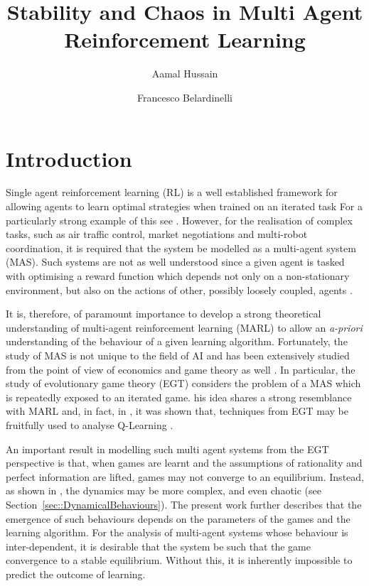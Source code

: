 \documentclass[sigconf]{aamas}
\title[InstabilityinMARL]{Stability and Chaos in Multi Agent Reinforcement Learning}
\author{Aamal Hussain}
\affiliation{
  \department{Department of Computing}
  \institution{Imperial College London}}
\author{Francesco Belardinelli}
\affiliation{
  \department{Department of Computing}
  \institution{Imperial College London}}
\begin{document}

\pagestyle{fancy}
\fancyhead{}


\maketitle 


\section{Introduction}

Single agent reinforcement learning (RL) is a well established framework for allowing agents to learn optimal strategies when trained on an iterated task 
For a particularly strong example of this see \cite{Vinyals2019}. However, for the realisation of complex tasks, such as air traffic control, market negotiations and multi-robot coordination, it is required that the system be modelled as a multi-agent system (MAS). Such systems are not as well understood since a given agent is tasked with optimising a reward function which depends not only on a non-stationary environment, but also on the actions of other, possibly loosely coupled, agents \cite{SchwartzMulti-agentApproach}. 

It is, therefore, of paramount importance to develop a strong theoretical understanding of multi-agent reinforcement learning (MARL) to allow an {\em a-priori} understanding of the behaviour of a given learning algorithm. Fortunately, the study of MAS is not unique to the field of AI and has been extensively studied from the point of view of economics and game theory as well \cite{ShohamMultiagentFoundations}. In particular, the study of evolutionary game theory (EGT) considers the problem of a MAS which is repeatedly exposed to an iterated game. 
his idea shares a strong resemblance with MARL and, in fact, in \cite{Tuyls2006AnGames}, it was shown that, techniques from EGT may be fruitfully used to analyse Q-Learning \cite{Sutton2018}.

An important result in modelling such multi agent systems from the EGT perspective is that, when games are learnt and the assumptions of rationality and perfect information are lifted, games may not converge to an equilibrium. Instead, as shown in \cite{Sanders2018}, the dynamics may be more complex, and even chaotic (see Section~\ref{sec::DynamicalBehaviours}). The present work further describes that the emergence of such behaviours depends on the parameters of the games and the learning algorithm. For the analysis of multi-agent systems whose behaviour is inter-dependent, it is desirable that the system be such that the game convergence to a stable equilibrium. Without this, it is inherently impossible to predict the outcome of learning.  
\end{document}
